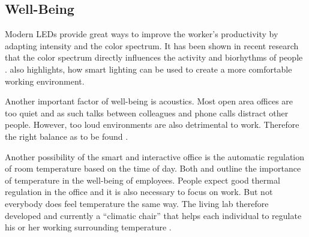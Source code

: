 \subsection{Well-Being}

Modern LEDs provide great ways to improve the worker's productivity by adapting intensity and the color spectrum. It has been shown in recent research that the color spectrum directly influences the activity and biorhythms of people  \cite{living-lab}. \cite{iotagenda} also highlights, how smart lighting can be used to create a more comfortable working environment.

Another important factor of well-being is acoustics. Most open area offices are too quiet and as such talks between colleagues and phone calls distract other people. However, too loud environments are also detrimental to work. Therefore the right balance as to be found \cite{living-lab}. 

Another possibility of the smart and interactive office is the automatic regulation of room temperature based on the time of day. Both \cite{iotagenda} and \cite{living-lab} outline the importance of temperature in the well-being of employees. People expect good thermal regulation in the office and it is also necessary to focus on work. But not everybody does feel temperature the same way. The living lab therefore developed and currently a ``climatic chair'' that helps each individual to regulate his or her working surrounding temperature \cite{living-lab}.


